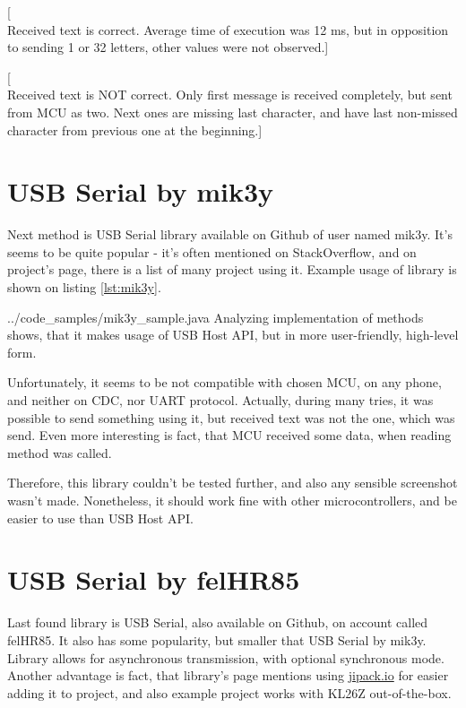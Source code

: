 [\\Received text is correct. 
Average time of execution was 12 ms, but in opposition to sending 1 or 32
letters, other values were not observed.]

[\\Received text is NOT correct. 
Only first message is received completely, but sent from MCU as two.
Next ones are missing last character, and have last non-missed character from
previous one at the beginning.]

\clearpage

\section{USB Serial by mik3y}
Next method is USB Serial library available on Github of user named mik3y.
It's seems to be quite popular - it's often mentioned on StackOverflow, and on
project's page, there is a list of many project using it.
Example usage of library is shown on listing \ref{lst:mik3y}.

{../code_samples/mik3y_sample.java}
Analyzing implementation of methods shows, that it makes usage of USB Host API,
but in more user-friendly, high-level form.

Unfortunately, it seems to be not compatible with chosen MCU, on any phone, and
neither on CDC, nor UART protocol.
Actually, during many tries, it was possible to send something using it, but
received text was not the one, which was send. 
Even more interesting is fact, that MCU received some data, when reading method
was called.

Therefore, this library couldn't be tested further, and also any sensible
screenshot wasn't made.
Nonetheless, it should work fine with other microcontrollers, and be easier to
use than USB Host API.

\clearpage

\section{USB Serial by felHR85}
Last found library is USB Serial, also available on Github, on account called
felHR85.
It also has some popularity, but smaller that USB Serial by mik3y.
Library allows for asynchronous transmission, with optional synchronous mode.
Another advantage is fact, that library's page mentions using \url{jipack.io}
for easier adding it to project, and also example project works with KL26Z
out-of-the-box.

